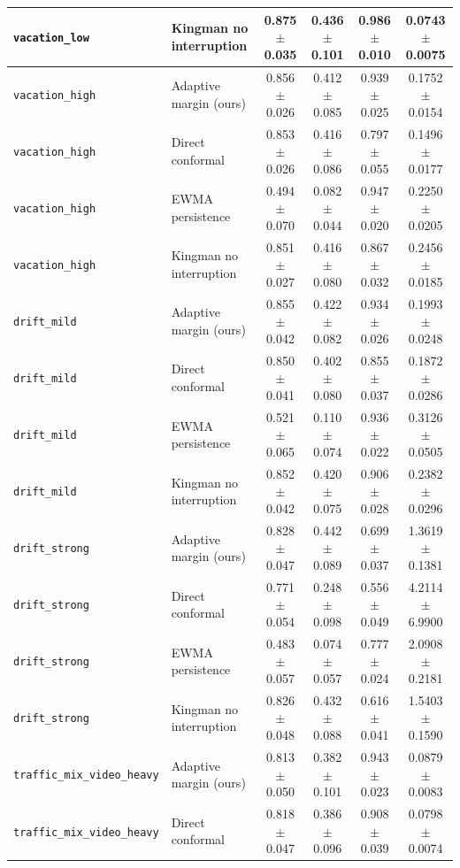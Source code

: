 \begin{tabular}{llcccc}
\texttt{vacation\_low} & Kingman no interruption & 0.875 $\pm$ 0.035 & 0.436 $\pm$ 0.101 & 0.986 $\pm$ 0.010 & 0.0743 $\pm$ 0.0075 \\
\hline
\texttt{vacation\_high} & Adaptive margin (ours) & 0.856 $\pm$ 0.026 & 0.412 $\pm$ 0.085 & 0.939 $\pm$ 0.025 & 0.1752 $\pm$ 0.0154 \\
\texttt{vacation\_high} & Direct conformal & 0.853 $\pm$ 0.026 & 0.416 $\pm$ 0.086 & 0.797 $\pm$ 0.055 & 0.1496 $\pm$ 0.0177 \\
\texttt{vacation\_high} & EWMA persistence & 0.494 $\pm$ 0.070 & 0.082 $\pm$ 0.044 & 0.947 $\pm$ 0.020 & 0.2250 $\pm$ 0.0205 \\
\texttt{vacation\_high} & Kingman no interruption & 0.851 $\pm$ 0.027 & 0.416 $\pm$ 0.080 & 0.867 $\pm$ 0.032 & 0.2456 $\pm$ 0.0185 \\
\hline
\texttt{drift\_mild} & Adaptive margin (ours) & 0.855 $\pm$ 0.042 & 0.422 $\pm$ 0.082 & 0.934 $\pm$ 0.026 & 0.1993 $\pm$ 0.0248 \\
\texttt{drift\_mild} & Direct conformal & 0.850 $\pm$ 0.041 & 0.402 $\pm$ 0.080 & 0.855 $\pm$ 0.037 & 0.1872 $\pm$ 0.0286 \\
\texttt{drift\_mild} & EWMA persistence & 0.521 $\pm$ 0.065 & 0.110 $\pm$ 0.074 & 0.936 $\pm$ 0.022 & 0.3126 $\pm$ 0.0505 \\
\texttt{drift\_mild} & Kingman no interruption & 0.852 $\pm$ 0.042 & 0.420 $\pm$ 0.075 & 0.906 $\pm$ 0.028 & 0.2382 $\pm$ 0.0296 \\
\hline
\texttt{drift\_strong} & Adaptive margin (ours) & 0.828 $\pm$ 0.047 & 0.442 $\pm$ 0.089 & 0.699 $\pm$ 0.037 & 1.3619 $\pm$ 0.1381 \\
\texttt{drift\_strong} & Direct conformal & 0.771 $\pm$ 0.054 & 0.248 $\pm$ 0.098 & 0.556 $\pm$ 0.049 & 4.2114 $\pm$ 6.9900 \\
\texttt{drift\_strong} & EWMA persistence & 0.483 $\pm$ 0.057 & 0.074 $\pm$ 0.057 & 0.777 $\pm$ 0.024 & 2.0908 $\pm$ 0.2181 \\
\texttt{drift\_strong} & Kingman no interruption & 0.826 $\pm$ 0.048 & 0.432 $\pm$ 0.088 & 0.616 $\pm$ 0.041 & 1.5403 $\pm$ 0.1590 \\
\hline
\texttt{traffic\_mix\_video\_heavy} & Adaptive margin (ours) & 0.813 $\pm$ 0.050 & 0.382 $\pm$ 0.101 & 0.943 $\pm$ 0.023 & 0.0879 $\pm$ 0.0083 \\
\texttt{traffic\_mix\_video\_heavy} & Direct conformal & 0.818 $\pm$ 0.047 & 0.386 $\pm$ 0.096 & 0.908 $\pm$ 0.039 & 0.0798 $\pm$ 0.0074 \\

\end{tabular}

